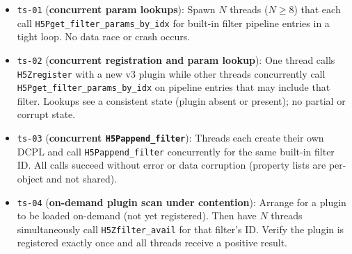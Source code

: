 \documentclass[../RFC-HDFG-2026-001.tex]{subfiles}
\begin{document}
\begin{itemize}
\item \texttt{ts-01} (\textbf{concurrent param lookups}): Spawn $N$ threads
  ($N \geq 8$) that each call \texttt{H5Pget\_filter\_params\_by\_idx} for built-in filter
  pipeline entries in a tight loop.  No data race or crash occurs.
\item \texttt{ts-02} (\textbf{concurrent registration and param lookup}): One thread
  calls \texttt{H5Zregister} with a new v3 plugin while other threads concurrently
  call \texttt{H5Pget\_filter\_params\_by\_idx} on pipeline entries that may include that
  filter.  Lookups see a consistent state (plugin absent or present);
  no partial or corrupt state.
\item \texttt{ts-03} (\textbf{concurrent \texttt{H5Pappend\_filter}}): Threads each create
  their own DCPL and call \texttt{H5Pappend\_filter} concurrently for the same built-in
  filter ID.  All calls succeed without error or data corruption (property
  lists are per-object and not shared).
\item \texttt{ts-04} (\textbf{on-demand plugin scan under contention}): Arrange for a
  plugin to be loaded on-demand (not yet registered).  Then have $N$ threads
  simultaneously call \texttt{H5Zfilter\_avail} for that filter's ID.  Verify the
  plugin is registered exactly once and all threads receive a positive result.
\end{itemize}
\end{document}
